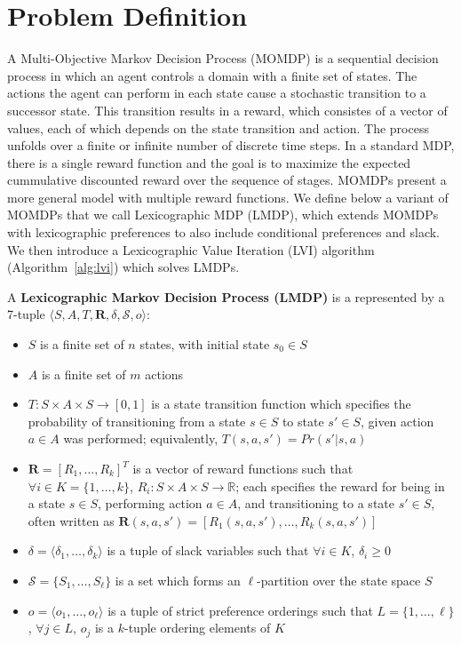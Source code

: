 \section{Problem Definition}
\label{sec:problem_definition}

A Multi-Objective Markov Decision Process (MOMDP) is a sequential decision process in which an agent controls a domain with a finite set of states. The actions the agent can perform in each state cause a stochastic transition to a successor state. This transition results in a reward, which consistes of a vector of values, each of which depends on the state transition and action. The process unfolds over a finite or infinite number of discrete time steps.  In a standard MDP, there is a single reward function and the goal is to maximize the expected cummulative discounted reward over the sequence of stages. MOMDPs present a more general model with multiple reward functions. We define below a variant of MOMDPs that we call Lexicographic MDP (LMDP), which extends MOMDPs with lexicographic preferences to also include conditional preferences and slack. We then introduce a Lexicographic Value Iteration (LVI) algorithm (Algorithm~\ref{alg:lvi}) which solves LMDPs.

\begin{definition}
    \label{def:lmdp}
    A \textbf{Lexicographic Markov Decision Process (LMDP)} is a represented by a 7-tuple $\langle S, A, T, \mathbf{R}, \delta, \mathcal{S}, o \rangle$:
    \begin{itemize}
        \item $S$ is a finite set of $n$ states, with initial state $s_0 \in S$
        \item $A$ is a finite set of $m$ actions
        \item $T : S \times A \times S \rightarrow [0, 1]$ is a state transition function which specifies the probability of transitioning from a state $s \in S$ to state $s' \in S$, given action $a \in A$ was performed; equivalently, $T(s, a, s') = Pr(s' | s, a)$
        \item $\mathbf{R} = [R_1, \ldots, R_k]^T$ is a vector of reward functions such that $\forall i \in K = \{1, \ldots, k\}$, $R_i : S \times A \times S \rightarrow \mathbb{R}$; each specifies the reward for being in a state $s \in S$, performing action $a \in A$, and transitioning to a state $s' \in S$, often written as $\mathbf{R}(s, a, s') = [R_1(s, a, s'), \ldots, R_k(s, a, s')]$
        \item $\delta = \langle \delta_1, \ldots, \delta_k \rangle$ is a tuple of slack variables such that $\forall i \in K$, $\delta_i \geq 0$
        \item $\mathcal{S} = \{S_1, \dots, S_\ell\}$ is a set which forms an $\ell$-partition over the state space $S$
        \item $o = \langle o_1, \ldots, o_\ell \rangle$ is a tuple of strict preference orderings such that $L = \{1, \ldots, \ell\}$, $\forall j \in L$, $o_j$ is a $k$-tuple ordering elements of $K$
    \end{itemize}
\end{definition}

